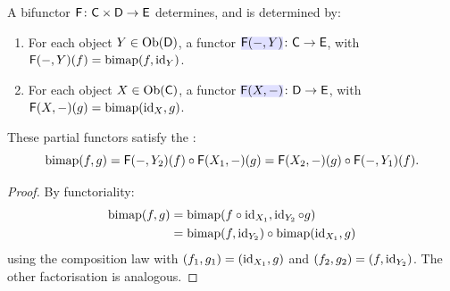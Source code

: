 \documentclass[../preamble]{subfiles}
\begin{document}
\begin{proposition}
  \label{prop:separate-functoriality}
  A bifunctor $\Functor{F} \colon \Category{C} \times \Category{D} \lto \Category{E}$
  determines, and is determined by:
  \begin{enumerate}
    \item For each object $Y \in \operatorname{Ob}(\mathsf{D})$,
      a functor
      $\newmath{\Functor{F}(\mathord{-}, Y)} \colon \Category{C} \lto \Category{E}$,
      with
      $\mathsf{F}(\mathord{-}, Y)(f) = \operatorname{bimap}(f, \operatorname{id}_Y)$.

    \item For each object $X \in \operatorname{Ob}(\mathsf{C})$,
      a functor
      $\newmath{\Functor{F}(X, \mathord{-})} \colon \Category{D} \lto \Category{E}$,
      with
      $\mathsf{F}(X, \mathord{-})(g) = \operatorname{bimap}(\operatorname{id}_X, g)$.
  \end{enumerate}

  These partial functors satisfy the :
  \begin{equation}
    \label{eq:bifunctor-interchange}
    \operatorname{bimap}(f, g)
      = \mathsf{F}(\mathord{-}, Y_2)(f) \circ \mathsf{F}(X_1, \mathord{-})(g)
      = \mathsf{F}(X_2, \mathord{-})(g) \circ \mathsf{F}(\mathord{-}, Y_1)(f).
  \end{equation}
\end{proposition}

\begin{proof}
  By functoriality:
  \begin{align*}
    \operatorname{bimap}(f, g)
    &= \operatorname{bimap}(f \circ \operatorname{id}_{X_1}, \operatorname{id}_{Y_2} \circ g) \\
    &= \operatorname{bimap}(f, \operatorname{id}_{Y_2}) \circ \operatorname{bimap}(\operatorname{id}_{X_1}, g)
  \end{align*}
  using the composition law with
  $(f_1, g_1) = (\operatorname{id}_{X_1}, g)$ and $(f_2, g_2) = (f, \operatorname{id}_{Y_2})$.
  The other factorisation is analogous.
\end{proof}
\end{document}
